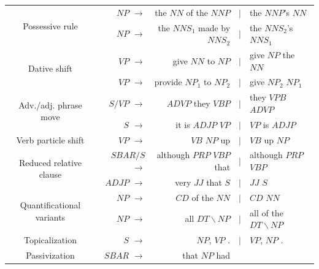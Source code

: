 \documentclass[11pt]{article}
\begin{document}
\begin{table}[!ht]
  \begin{center}
\small
  \begin{tabular}{|c|rrcl|}
    \hline
    \multirow{2}{*}{Possessive rule} & $\mathit{NP}$ $\rightarrow$ & the
    $\mathit{NN}$ of the $\mathit{NNP}$ & $\mid$ & the
    $\mathit{NNP}$'s $\mathit{NN}$ \\
    & $\mathit{NP}$ $\rightarrow$  & the $\mathit{NNS}_1$ made by
    $\mathit{NNS}_2$ & $\mid$ & the $\mathit{NNS}_2$'s
    $\mathit{NNS}_1$ \\
    \hline
    \multirow{2}{*}{Dative shift} & $\mathit{VP}$ $\rightarrow$ & give
    $\mathit{NN}$ to $\mathit{NP}$ & $\mid$ & give $\mathit{NP}$ the
    $\mathit{NN}$ \\
    & $\mathit{VP}$ $\rightarrow$ & provide $\mathit{NP}_1$ to
    $\mathit{NP}_2$ & $\mid$ & give $\mathit{NP}_2$
    $\mathit{NP}_1$ \\
    \hline
    \hline
    \multirow{2}{*}{Adv./adj. phrase move} & 
    $\mathit{S/VP}$ $\rightarrow$ & $\mathit{ADVP}$ they $\mathit{VBP}$
    & $\mid$ & they $\mathit{VPB}$ $\mathit{ADVP}$ \\
    & $\mathit{S}$ $\rightarrow$ & it is $\mathit{ADJP}$ $\mathit{VP}$
    & $\mid$ & $\mathit{VP}$ is $\mathit{ADJP}$ \\
    \hline
    Verb particle shift & 
    $\mathit{VP}$ $\rightarrow$ & $\mathit{VB}$ $\mathit{NP}$ up &
    $\mid$ & $\mathit{VB}$ up $\mathit{NP}$ \\
    \hline
    \multirow{2}{*}{Reduced relative clause} & $\mathit{SBAR/S}$ $\rightarrow$ &
    although $\mathit{PRP}$ $\mathit{VBP}$ that & $\mid$ &although
    $\mathit{PRP}$ $\mathit{VBP}$ \\
    & $\mathit{ADJP}$ $\rightarrow$ &
    very $\mathit{JJ}$ that $\mathit{S}$ & $\mid$ & $\mathit{JJ}$ $\mathit{S}$ \\
    \hline
    \multirow{2}{*}{Quantificational variants} & 
    $\mathit{NP}$ $\rightarrow$ & $\mathit{CD}$ of the $\mathit{NN}$
    & $\mid$ & $\mathit{CD}$ $\mathit{NN}$ \\
    & $\mathit{NP}$ $\rightarrow$ & all $\mathit{DT\backslash NP}$
    & $\mid$ & all of the $\mathit{DT\backslash NP}$ \\
    \hline
    Topicalization  & $\mathit{S}$ $\rightarrow$ & $\mathit{NP}$,
    $\mathit{VP}$ . & $\mid$ & $\mathit{VP}$, $\mathit{NP}$ . \\
    \hline
    \hline
    Passivization &
    $\mathit{SBAR}$ $\rightarrow$ & that $\mathit{NP}$ had

\end{tabular}
\end{center}
\end{table}
\end{document}
